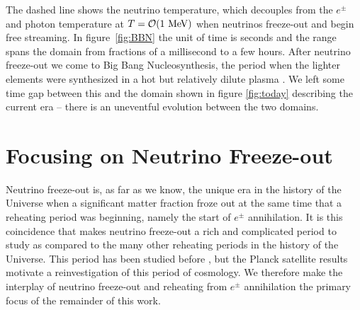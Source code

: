  The dashed line shows the neutrino temperature, which decouples from the $e^\pm$ and photon temperature at $T={\cal O}(1\MeV)$ when neutrinos freeze-out and begin free streaming. In figure~\ref{fig:BBN} the unit of time is seconds and the range spans the domain from fractions of a millisecond to a few hours. After neutrino freeze-out we come to Big Bang Nucleosynthesis, the period when the lighter elements were synthesized in a hot but relatively dilute plasma \cite{Iocco:2008va}. We left some time gap between this and the domain shown in figure \ref{fig:today}  describing the current era -- there is an uneventful evolution between the two domains. 

\section{Focusing on Neutrino Freeze-out}
Neutrino freeze-out is, as far as we know, the unique era in the history of the Universe when a significant matter fraction froze out at the same time that a reheating period was beginning, namely the start of $e^\pm$ annihilation.  It is this coincidence that makes neutrino freeze-out a rich and complicated period to study as compared to the many other reheating periods in the history of the Universe. This period has been studied before \cite{Madsen,Dolgov_Hansen,Gnedin,Esposito2000,Mangano2002,Mangano2005}, but the Planck satellite results \cite{Planck} motivate a reinvestigation of this period of cosmology.  We therefore make the interplay of neutrino freeze-out and reheating from $e^\pm$ annihilation the primary focus of the remainder of this work.

